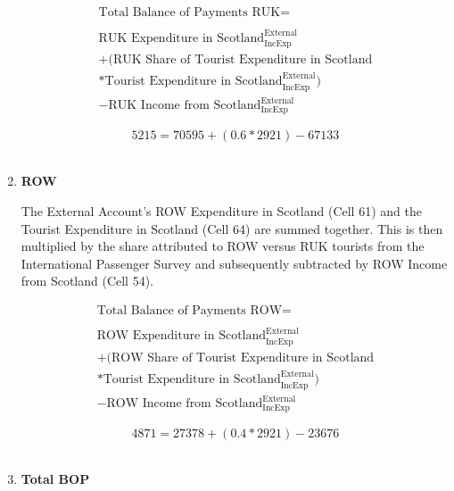 \begin{enumerate}
\begin{equation}
\begin{split}
\text{Total Balance of Payments RUK} =  \\ \\
\text{RUK Expenditure in Scotland}^\text{External}_\text{IncExp}\\
+(\text{RUK Share of Tourist Expenditure in Scotland}\\
*\text{Tourist  Expenditure in Scotland}^\text{External}_\text{IncExp})\\
-\text{RUK Income from Scotland}^\text{External}_\text{IncExp}
\end{split} \label{eq:2.5.73}
\end{equation}

\begin{equation} \nonumber
5215 = 70595+(0.6*2921)-67133
\end{equation}\\


\item \textbf {ROW}

The External Account's ROW Expenditure in Scotland (Cell 61) and the Tourist Expenditure in Scotland (Cell 64) are summed together. This is then multiplied by the share attributed to ROW versus RUK tourists from the International Passenger Survey \cite{ONS2010a} and subsequently subtracted by ROW Income from Scotland (Cell 54). 

\begin{equation}
\begin{split}
\text{Total Balance of Payments ROW} =  \\ \\
\text{ROW Expenditure in Scotland}^\text{External}_\text{IncExp}\\
+(\text{ROW Share of Tourist Expenditure in Scotland}\\
*\text{Tourist  Expenditure in Scotland}^\text{External}_\text{IncExp})\\
-\text{ROW Income from Scotland}^\text{External}_\text{IncExp}
\end{split} \label{eq:2.5.74}
\end{equation}

\begin{equation} \nonumber
4871 = 27378+(0.4*2921)-23676
\end{equation}\\


\item \textbf {Total BOP}


\end{enumerate}
